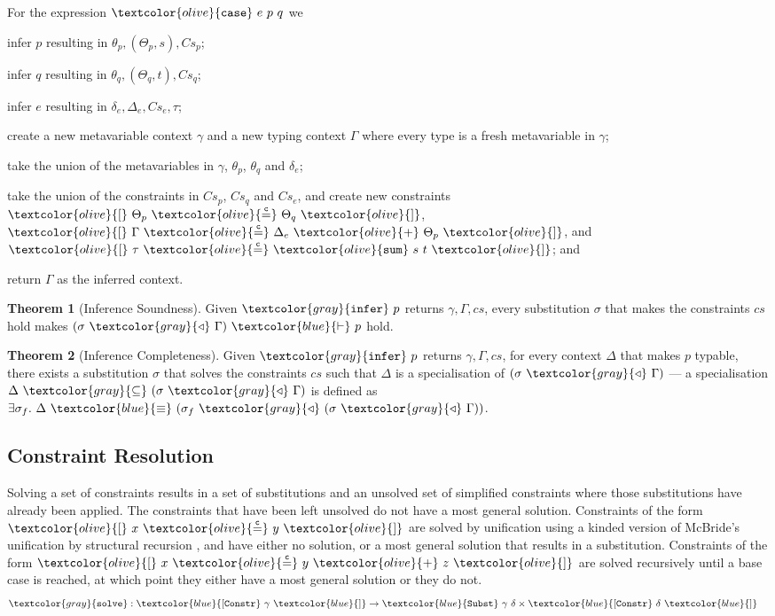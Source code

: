 \documentclass[sigplan,screen,review]{acmart}
\theoremstyle{definition}\newtheorem{mytheorem}{Theorem}[section]
\newcommand{\constr}[1]{\textcolor{olive}{\mathtt{#1}}}
\newcommand{\func}[1]{\textcolor{gray}{\mathtt{#1}}}
\newcommand{\type}[1]{\textcolor{blue}{\mathtt{#1}}}
\newcommand{\tEq}[2]{#1~\type{\equiv}~#2}
\newcommand{\tProc}[2]{#1 ~ \type{\vdash} ~ #2}
\newcommand{\tConstrs}[1]{\type{[Constr} ~ #1 ~ \type{]}}
\newcommand{\scase}{\constr{case}}
\newcommand{\tsum}{\constr{sum}}
\newcommand{\subst}[2]{#1 ~ \func{\triangleleft} ~ #2}
\newcommand{\tSubst}[2]{\type{Subst}~#1~#2}
\newcommand{\eqconstr}[2]{\constr{[} ~ #1 ~ \constr{\stackrel{c}{=}} ~ #2 ~ \constr{]}}
\newcommand{\sumconstr}[3]{\constr{[} ~ #1 ~ \constr{\stackrel{c}{=}} ~ #2 ~ \constr{+} ~ #3 ~ \constr{]}}
\begin{document}
For the expression $\scase~e~p~q$ we
  \begin{enumerate*}[label=\textcolor{gray}{\arabic*)}]
  \item infer $p$ resulting in $\theta_p, (\Theta_p, s) , Cs_p$;
  \item infer $q$ resulting in $\theta_q, (\Theta_q, t) , Cs_q$;
  \item infer $e$ resulting in $\delta_e, \Delta_e, Cs_e, \tau$;
  \item create a new metavariable context $\gamma$ and a new typing context $\Gamma$ where every type is a fresh metavariable in $\gamma$;
  \item take the union of the metavariables in $\gamma$, $\theta_p$, $\theta_q$ and $\delta_e$;
  \item take the union of the constraints in $Cs_p$, $Cs_q$ and $Cs_e$, and create new constraints $\eqconstr{\Theta_p}{\Theta_q}$, $\sumconstr{\Gamma}{\Delta_e}{\Theta_p}$, and $\eqconstr{\tau}{\tsum~s~t}$; and
  \item return $\Gamma$ as the inferred context.
\end{enumerate*}

\begin{mytheorem}[Inference Soundness]\label{inference-soundness}
Given $\func{infer}~p$ returns $\gamma , \Gamma , cs$, every substitution \(\sigma\) that makes the constraints $cs$ hold makes $\tProc{(\subst{\sigma}{\Gamma})}{p}$ hold.
\end{mytheorem}

\begin{mytheorem}[Inference Completeness]\label{inference-completeness}
Given $\func{infer}~p$ returns $\gamma , \Gamma , cs$, for every context \(\Delta\) that makes $p$ typable, there exists a substitution \(\sigma\) that solves the constraints $cs$ such that $\Delta$ is a specialisation of $(\subst{\sigma}{\Gamma})$ --- a specialisation $\Delta ~ \func{\subseteq} ~ (\subst{\sigma}{\Gamma})$ is defined as $\exists \sigma_f . ~ \tEq{\Delta}{(\subst{\sigma_f}{(\subst{\sigma}{\Gamma})})}$.
\end{mytheorem}

\subsection{Constraint Resolution}
\label{constraint-resolution}

Solving a set of constraints results in a set of substitutions and an unsolved set of simplified constraints where those substitutions have already been applied.
The constraints that have been left unsolved do not have a most general solution.
Constraints of the form $\eqconstr{x}{y}$ are solved by unification using a kinded version of McBride's unification by structural recursion \cite{McBride03}, and have either no solution, or a most general solution that results in a substitution.
Constraints of the form $\sumconstr{x}{y}{z}$ are solved recursively until a base case is reached, at which point they either have a most general solution or they do not.
$$
\begin{aligned}
\func{solve} &: \tConstrs{\gamma} \to \tSubst{\gamma}{\delta} \times \tConstrs{\delta}
\end{aligned}
$$
\end{document}
